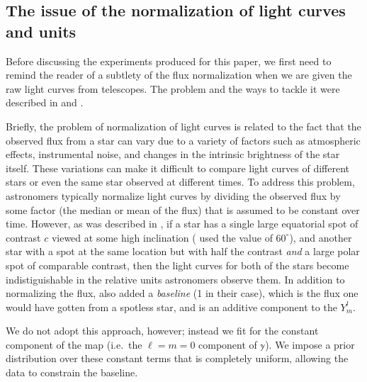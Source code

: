 \documentclass[twocolumn]{aastex631}
\begin{document}

\subsection{The issue of the normalization of light curves and units}
Before discussing the experiments produced for this paper, we first need to
remind the reader of a subtlety of the flux normalization when we are given the
raw light curves from telescopes.  The problem and the ways to tackle it were
described in \cite{Luger2021a} and \cite{Luger2021b}. 

Briefly, the problem of normalization of light curves is related to the fact
that the observed flux from a star can vary due to a variety of factors such as
atmospheric effects, instrumental noise, and changes in the intrinsic brightness
of the star itself. These variations can make it difficult to compare light
curves of different stars or even the same star observed at different times. To
address this problem, astronomers typically normalize light curves by dividing
the observed flux by some factor (the median or mean of the flux) that is
assumed to be constant over time. However, as was described in
\cite{Luger2021a}, if a star has a single large equatorial spot of contrast $c$
viewed at some high inclination (\cite{Luger2021a} used the value of
$60^\circ$), and another star with a spot at the same location but with half the
contrast \emph{and} a large polar spot of comparable contrast, then the light
curves for both of the stars become indistiguishable in the relative units
astronomers observe them. In addition to normalizing the flux, \cite{Luger2021a}
also added a \emph{baseline} (1 in their case), which is the flux one would have
gotten from a spotless star, and is an additive component to the $Y_m^l$.

We do not adopt this approach, however; instead we fit for the constant
component of the map (i.e.\ the $\ell = m = 0$ component of $\mathbb{y}$).  We
impose a prior distribution over these constant terms that is completely
uniform, allowing the data to constrain the baseline.  
\end{document}
